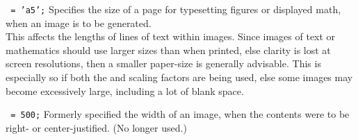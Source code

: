 \begin{htmllist}
\item [\fn{\$PAPERSIZE}\texttt{ = 'a5';}\label{papersize}]
Specifies the size of a page for typesetting figures
or displayed math, when an image is to be generated.\\
This affects the lengths of lines of text within images.
Since images of text or mathematics should use larger sizes than
when printed, else clarity is lost at screen resolutions,
then a smaller paper-size is generally advisable.
This is especially so if both the 
and  scaling factors are being used,
else some images may become excessively large, including a lot
of blank space.


\item [\fn{\$LINE\_WIDTH}\texttt{ = 500;}\label{linewidth}]
Formerly specified the width of an image, when the contents were
to be right- or center-justified. (No longer used.)

\end{htmllist}

\bigskip

